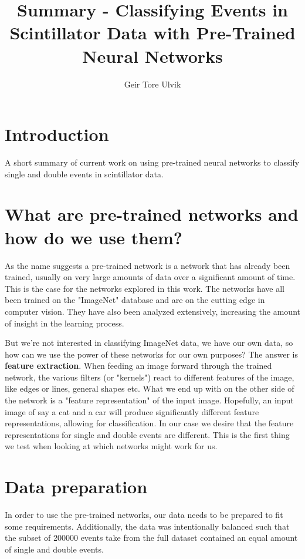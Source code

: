 \documentclass[12pt, notitlepage]{article}
\begin{document}
\title{Summary - Classifying Events in Scintillator Data with Pre-Trained Neural Networks}
\author{Geir Tore Ulvik}
\maketitle
\section{Introduction}
A short summary of current work on using pre-trained neural networks to classify
single and double events in scintillator data.

\section{What are pre-trained networks and how do we use them?}
As the name suggests a pre-trained network is a network that has already
been trained, usually on very large amounts of data over a significant amount
of time. This is the case for the networks explored in this work. The networks
have all been trained on the "ImageNet" database and are on the cutting edge in
computer vision. They have also been analyzed extensively, increasing the amount
of insight in the learning process.

But we're not interested in classifying ImageNet data, we have our own data,
so how can we use the power of these networks for our own purposes?
The answer is \textbf{feature extraction}. When feeding an image forward
through the trained network, the various filters (or "kernels") react to different features
of the image, like edges or lines, general shapes etc. What we end up with on the other side
of the network is a "feature representation" of the input image. Hopefully, an input image
of say a cat and a car will produce significantly different feature representations, allowing
for classification. In our case we desire that the feature representations for single and
double events are different. This is the first thing we test when looking at which networks
might work for us.

\section{Data preparation}
In order to use the pre-trained networks, our data needs to be prepared to fit some requirements.
Additionally, the data was intentionally balanced such that the subset of 200000 events take from
the full dataset contained an equal amount of single and double events.
\end{document}
